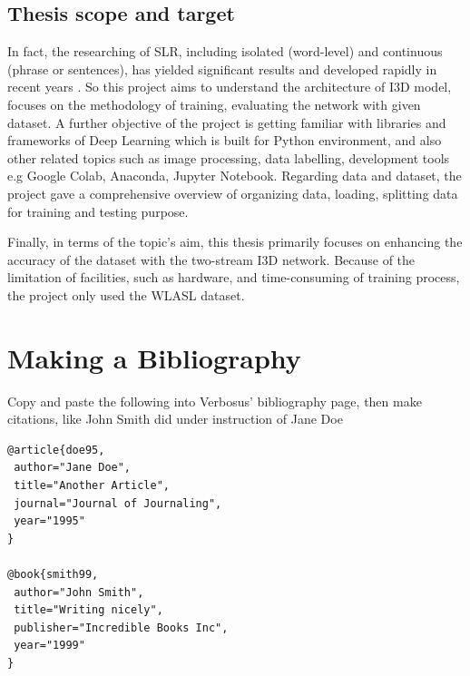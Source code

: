 \documentclass[a4paper, 12pt]{article}
\begin{document}
\subsection{Thesis scope and target}
In fact, the researching of SLR, including isolated (word-level) and continuous (phrase or sentences), has yielded significant results and developed rapidly in recent years .
So this project aims to understand the architecture of I3D model, focuses on the methodology of training, evaluating the network with given dataset. A further objective of the project is getting familiar with libraries and frameworks of Deep Learning which is built for Python environment, and also other related topics such as image processing, data labelling, development tools e.g Google Colab, Anaconda, Jupyter Notebook.
Regarding data and dataset, the project gave a comprehensive overview of organizing data, loading, splitting data for training and testing purpose.

Finally, in terms of the topic's aim, this thesis primarily focuses on enhancing the accuracy of the dataset with the two-stream I3D network. Because of the limitation of facilities, such as hardware, and time-consuming of training process, the project only used the WLASL dataset.

\section{Making a Bibliography}
Copy and paste the following into Verbosus' bibliography page, then make citations, like John Smith did under instruction of Jane Doe

\begin{lstlisting}[frame=single, columns=fullflexible, basicstyle=\ttfamily]
@article{doe95,
 author="Jane Doe",
 title="Another Article",
 journal="Journal of Journaling",
 year="1995"
}

@book{smith99,
 author="John Smith",
 title="Writing nicely",
 publisher="Incredible Books Inc",
 year="1999"
}
\end{lstlisting}


\newpage



\end{document}
